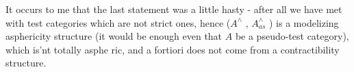 It occurs to me that  the last statement  was a little hasty  -
after all we have met with test categories which are not strict ones,
hence ($A^{\wedge}$ , $A^{\wedge}_{as}$ )  is a modelizing asphericity structure  (it would be
enough even that $A$ be a pseudo-test category),  which is'nt totally asphe
ric,  and a fortiori does not come from a contractibility structure. 

